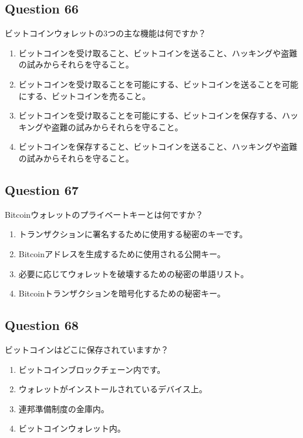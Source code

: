 \documentclass[12pt,a4paper]{article}
\begin{document}
\bigskip


\subsection*{Question 66}
ビットコインウォレットの3つの主な機能は何ですか？

\begin{enumerate}[label=\Alph*., leftmargin=*]
\item ビットコインを受け取ること、ビットコインを送ること、ハッキングや盗難の試みからそれらを守ること。
\item ビットコインを受け取ることを可能にする、ビットコインを送ることを可能にする、ビットコインを売ること。
\item ビットコインを受け取ることを可能にする、ビットコインを保存する、ハッキングや盗難の試みからそれらを守ること。
\item ビットコインを保存すること、ビットコインを送ること、ハッキングや盗難の試みからそれらを守ること。
\end{enumerate}

\bigskip


\subsection*{Question 67}
Bitcoinウォレットのプライベートキーとは何ですか？

\begin{enumerate}[label=\Alph*., leftmargin=*]
\item トランザクションに署名するために使用する秘密のキーです。
\item Bitcoinアドレスを生成するために使用される公開キー。
\item 必要に応じてウォレットを破壊するための秘密の単語リスト。
\item Bitcoinトランザクションを暗号化するための秘密キー。
\end{enumerate}

\bigskip


\subsection*{Question 68}
ビットコインはどこに保存されていますか？

\begin{enumerate}[label=\Alph*., leftmargin=*]
\item ビットコインブロックチェーン内です。
\item ウォレットがインストールされているデバイス上。
\item 連邦準備制度の金庫内。
\item ビットコインウォレット内。
\end{enumerate}
\end{document}
